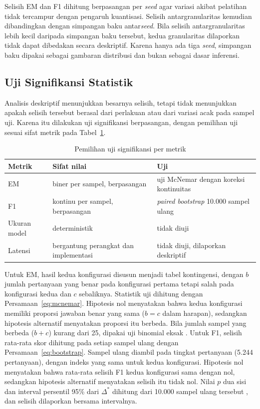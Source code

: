 Selisih EM dan F1 dihitung berpasangan per \textit{seed} agar variasi akibat pelatihan tidak tercampur dengan pengaruh kuantisasi. Selisih antargranularitas kemudian dibandingkan dengan simpangan baku antar\textit{seed}. Bila selisih antargranularitas lebih kecil daripada simpangan baku tersebut, kedua granularitas dilaporkan tidak dapat dibedakan secara deskriptif. Karena hanya ada tiga \textit{seed}, simpangan baku dipakai sebagai gambaran distribusi dan bukan sebagai dasar inferensi.

\subsection{Uji Signifikansi Statistik}

Analisis deskriptif menunjukkan besarnya selisih, tetapi tidak menunjukkan apakah selisih tersebut berasal dari perlakuan atau dari variasi acak pada sampel uji. Karena itu dilakukan uji signifikansi berpasangan, dengan pemilihan uji sesuai sifat metrik pada Tabel~\ref{tab:uji-metrik}.

\begin{table}[!ht]
  \centering
  \small
  \renewcommand{\arraystretch}{1.2}
  \caption{Pemilihan uji signifikansi per metrik}
  \label{tab:uji-metrik}
  \begin{tabularx}{\textwidth}{@{}l>{\raggedright\arraybackslash}p{5.6cm}X@{}}
    \hline
    \textbf{Metrik} & \textbf{Sifat nilai} & \textbf{Uji} \\
    \hline
    EM & biner per sampel, berpasangan & uji McNemar dengan koreksi kontinuitas \\
    F1 & kontinu per sampel, berpasangan & \textit{paired bootstrap} 10.000 sampel ulang \\
    Ukuran model & deterministik & tidak diuji \\
    Latensi & bergantung perangkat dan implementasi & tidak diuji, dilaporkan deskriptif \\
    \hline
  \end{tabularx}
\end{table}

Untuk EM, hasil kedua konfigurasi disusun menjadi tabel kontingensi, dengan $b$ jumlah pertanyaan yang benar pada konfigurasi pertama tetapi salah pada konfigurasi kedua dan $c$ sebaliknya. Statistik uji dihitung dengan Persamaan~\ref{eq:mcnemar}. Hipotesis nol menyatakan bahwa kedua konfigurasi memiliki proporsi jawaban benar yang sama ($b = c$ dalam harapan), sedangkan hipotesis alternatif menyatakan proporsi itu berbeda. Bila jumlah sampel yang berbeda ($b + c$) kurang dari 25, dipakai uji binomial eksak \parencite{fagerland2013mcnemar}. Untuk F1, selisih rata-rata skor dihitung pada setiap sampel ulang dengan Persamaan~\ref{eq:bootstrap}. Sampel ulang diambil pada tingkat pertanyaan (5.244 pertanyaan), dengan indeks yang sama untuk kedua konfigurasi. Hipotesis nol menyatakan bahwa rata-rata selisih F1 kedua konfigurasi sama dengan nol, sedangkan hipotesis alternatif menyatakan selisih itu tidak nol. Nilai $p$ dua sisi dan interval persentil 95\% dari $\Delta^{*}$ dihitung dari 10.000 sampel ulang tersebut \parencite{bergkirkpatrick2012, efron1993}, dan selisih dilaporkan bersama intervalnya.

